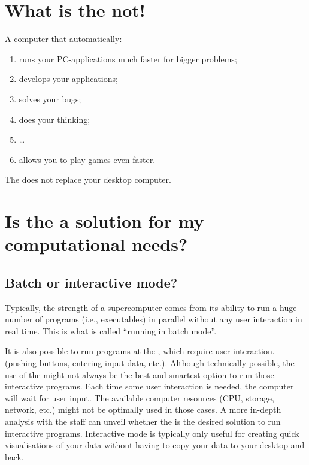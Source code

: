 \section{What is the \hpc not!}
\label{sec:what-is-the-hpc-not}

A computer that automatically:
\begin{enumerate}
  \item  runs your PC-applications much faster for bigger problems;
  \item  develops your applications;
  \item  solves your bugs;
  \item  does your thinking;
  \item  \dots
  \item  allows you to play games even faster.
\end{enumerate}
The \hpc does not replace your desktop computer.

\section{Is the \hpc a solution for my computational needs?}
\label{sec:is-the-hpc-a-solution-for-my-computational-needs}

\subsection{Batch or interactive mode?}
\label{sec:batch-or-interactive-mode}

Typically, the strength of a supercomputer comes from its ability to run a huge
number of programs (i.e., executables) in parallel without any user interaction
in real time. This is what is called ``running in batch mode''.

It is also possible to run programs at the \hpc, which require user
interaction. (pushing buttons, entering input data, etc.).  Although
technically possible, the use of the \hpc might not always be the best and
smartest option to run those interactive programs.  Each time some user
interaction is needed, the computer will wait for user input. The available
computer resources (CPU, storage, network, etc.) might not be optimally used in
those cases. A more in-depth analysis with the \hpc staff can unveil whether
the \hpc is the desired solution to run interactive programs.
Interactive mode is typically only useful for creating quick visualisations
of your data without having to copy your data to your desktop and back.

